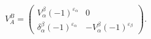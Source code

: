 \begin{equation}\label{20}
V^B_A=\left(\begin{array}{cc}V^\beta_\alpha(-1)^{\varepsilon_\alpha}&0\\
\delta^\beta_\alpha(-1)^{\varepsilon_\alpha}&
-V^\beta_\alpha(-1)^{\varepsilon_\beta}
\end{array}\right).
\end{equation}

